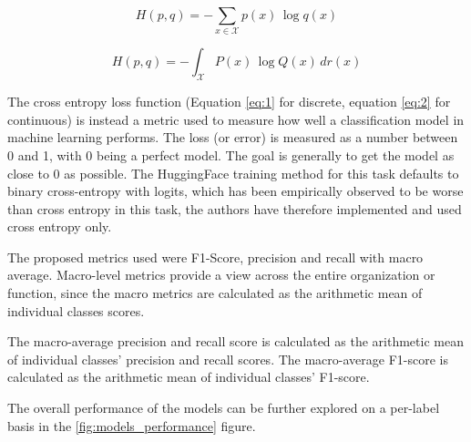 \documentclass[11pt]{article}
\begin{document}
\begin{equation} \label{eq:1}
H(p,q)=-\sum_{x\in {\mathcal {X}}}p(x)\,\log q(x) 
\end{equation}

\begin{equation} \label{eq:2}
 H(p,q)=-\int _{\mathcal {X}}P(x)\,\log Q(x)\,dr(x)
\end{equation}

The cross entropy loss function (Equation \ref{eq:1} for discrete, equation \ref{eq:2} for continuous) is instead a metric used to measure how well a classification model in machine learning performs. The loss (or error) is measured as a number between 0 and 1, with 0 being a perfect model. The goal is generally to get the model as close to 0 as possible.
The HuggingFace training method for this task defaults to binary cross-entropy with logits, which has been empirically observed to be worse than cross entropy in this task, the authors have therefore implemented and used cross entropy only.

The proposed metrics used were F1-Score, precision and recall with macro average.
Macro-level metrics provide a view across the entire organization or function, since the macro metrics are calculated as the arithmetic mean of individual classes scores.

The macro-average precision and recall score is calculated as the arithmetic mean of individual classes’ precision and recall scores. The macro-average F1-score is calculated as the arithmetic mean of individual classes’ F1-score.


\begin{table}[h!]
\centering
{}
\caption{\label{baseline} Experimental results on the test set (macro)}
\end{table} 

The overall performance of the models can be further explored on a per-label basis in the \ref{fig:models_performance} figure.
\end{document}
